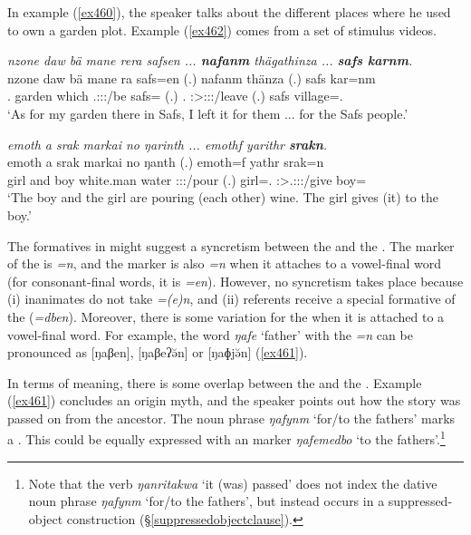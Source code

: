 In example (\ref{ex460}), the speaker talks about the different places where he used to own a garden plot. Example (\ref{ex462}) comes from a set of stimulus videos.

\begin{exe}
	\ex \emph{nzone daw bä mane rera safsen ... \textbf{nafanm} thägathinza ... \textbf{safs karnm}.}\\
	\gll nzone daw bä mane ra safs=en (.) nafanm thänza (.) safs kar=nm\\
	\Fsg.{\Poss} garden \Med{} which \Tsg.\F:\Sbj:\Pst:\Ipfv/be safs={\Loc} (.) \Tnsg.{\Poss} \Sg:\Sbj>\Stpl:\Io:\Pst:\Ipfv/leave (.) safs village=\Dat.{\Nsg}\\
	\trans `As for my garden there in Safs, I left it for them ... for the Safs people.'\\
	\label{ex460}
\end{exe}
\begin{exe}
	\ex \emph{emoth a srak markai no ŋarinth ... emothf yarithr \textbf{srakn}.}\\
	\gll emoth a srak markai no ŋanth (.) emoth=f yathr srak=n\\
	girl and boy {white.man} water \Stdu:\Sbj:\Nonpast:\Ipfv/pour (.) girl=\Erg.{\Sg} \Stsg:\Sbj>\Tsg.\Masc:\Io:\Nonpast:\Ipfv/give boy=\Dat\\ 
	\trans `The boy and the girl are pouring (each other) wine. The girl gives (it) to the boy.'\\
	\label{ex462}
\end{exe}
	
The formatives in  might suggest a syncretism between the   and the  . The  marker of the  is \emph{=n}, and the  marker is also \emph{=n} when it attaches to a vowel-final word (for consonant-final words, it is \emph{=en}). However, no syncretism takes place because (i) inanimates do not take  \emph{=(e)n}, and (ii)  referents receive a special formative of the   (\emph{=dben}). Moreover, there is some variation for the  when it is attached to a vowel-final word. For example, the word \emph{ŋafe} `father' with the  \emph{=n} can be pronounced as [ŋaβen], [ŋaβeʔə̆n] or [ŋaɸjə̆n] (\ref{ex461}).

In terms of meaning, there is some overlap between the  and the  . Example (\ref{ex461}) concludes an origin myth, and the speaker points out how the story was passed on from the ancestor. The noun phrase \emph{ŋafynm} `for/to the fathers' marks a . This could be equally expressed with an   marker \emph{ŋafemedbo} `to the fathers'.\footnote{Note that the verb \emph{ŋanritakwa} `it (was) passed' does not index the dative noun phrase \emph{ŋafynm} `for/to the fathers', but instead occurs in a suppressed-object construction (\S\ref{suppressedobjectclause}).}

